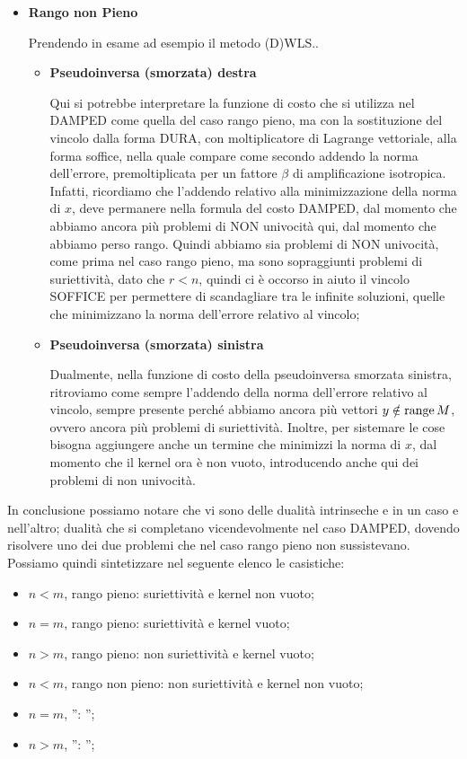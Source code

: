 \begin{itemize}
\item{\textbf{Rango non Pieno}}

Prendendo in esame ad esempio il metodo (D)WLS..

\begin{itemize}

\item{\textbf{Pseudoinversa (smorzata) destra}}

Qui si potrebbe interpretare la funzione di costo che si utilizza nel DAMPED come quella del caso rango pieno, ma con la sostituzione del vincolo dalla forma DURA, con moltiplicatore di Lagrange vettoriale, alla forma soffice, nella quale compare come secondo addendo la norma dell'errore, premoltiplicata per un fattore $\beta$ di amplificazione isotropica. Infatti, ricordiamo che l'addendo relativo alla minimizzazione della norma di $x$, deve permanere nella formula del costo DAMPED, dal momento che abbiamo ancora più problemi di NON univocità qui, dal momento che abbiamo perso rango. Quindi abbiamo sia problemi di NON univocità, come prima nel caso rango pieno, ma sono sopraggiunti problemi di suriettività, dato che $r<n$, quindi ci è occorso in aiuto il vincolo SOFFICE per permettere di scandagliare tra le infinite soluzioni, quelle che minimizzano la norma dell'errore relativo al vincolo;

\item{\textbf{Pseudoinversa (smorzata) sinistra}}

Dualmente, nella funzione di costo della pseudoinversa smorzata sinistra, ritroviamo come sempre l'addendo della norma dell'errore relativo al vincolo, sempre presente perché abbiamo ancora più vettori $y\notin\operatorname{range}{M}$, ovvero ancora più problemi di suriettività. Inoltre, per sistemare le cose bisogna aggiungere anche un termine che minimizzi la norma di $x$, dal momento che il kernel ora è non vuoto, introducendo anche qui dei problemi di non univocità.

\end{itemize}

\end{itemize}

In conclusione possiamo notare che vi sono delle dualità intrinseche e in un caso e nell'altro; dualità che si completano vicendevolmente nel caso DAMPED, dovendo risolvere uno dei due problemi che nel caso rango pieno non sussistevano. Possiamo quindi sintetizzare nel seguente elenco le casistiche:

\begin{itemize}
\item{$n<m$, rango pieno}: suriettività e kernel non vuoto;
\item{$n=m$, rango pieno}: suriettività e kernel vuoto;
\item{$n>m$, rango pieno}: non suriettività e kernel vuoto;
\item{$n<m$, rango non pieno}: non suriettività e kernel non vuoto;
\item{$n=m$, ''}: '';
\item{$n>m$, ''}: '';
\end{itemize}

